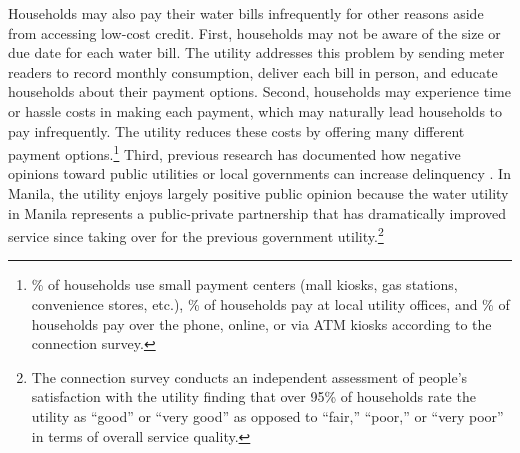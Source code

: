 \documentclass[12pt]{article}
\begin{document}


Households may also pay their water bills infrequently for other reasons aside from accessing low-cost credit.  First, households may not be aware of the size or due date for each water bill.  The utility addresses this problem by sending meter readers to record monthly consumption, deliver each bill in person, and educate households about their payment options.  Second, households may experience time or hassle costs in making each payment, which may naturally lead households to pay infrequently.  The utility reduces these costs by offering many different payment options.\footnote{\unskip\% of households use small payment centers (mall kiosks, gas stations, convenience stores, etc.), \unskip\% of households pay at local utility offices, and \unskip\% of households pay over the phone, online, or via ATM kiosks according to the connection survey.}  Third, previous research has documented how negative opinions toward public utilities or local governments can increase delinquency \citep{szabo2015reducing}.  In Manila, the utility enjoys largely positive public opinion because the water utility in Manila represents a public-private partnership that has dramatically improved service since taking over for the previous government utility.\footnote{The connection survey conducts an independent assessment of people's satisfaction with the utility finding that over 95\% of households rate the utility as ``good'' or ``very good'' as opposed to ``fair,'' ``poor,'' or ``very poor'' in terms of overall service quality.}



\end{document}
